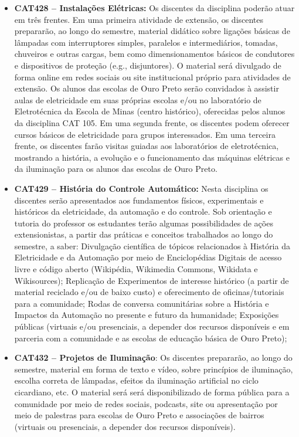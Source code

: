 \documentclass[
	12pt,				%
	openright,			%
	oneside,			%
	a4paper,			%
	english,			%
	brazil				%
	]{abntex2}
\begin{document}
\begin{itemize}
     \item \textbf{CAT428 -- Instalações Elétricas:} Os discentes da disciplina poderão atuar em três frentes. Em uma primeira atividade de extensão, os discentes prepararão, ao longo do semestre, material didático sobre ligações básicas de lâmpadas com interruptores simples, paralelos e intermediários, tomadas, chuveiros e outras cargas, bem como dimensionamentos básicos de condutores e dispositivos de proteção (e.g., disjuntores). O material será divulgado de forma online em redes sociais ou site institucional próprio para atividades de extensão. Os alunos das escolas de Ouro Preto serão convidados à assistir aulas de eletricidade em suas próprias escolas e/ou no laboratório de Eletrotécnica da Escola de Minas (centro histórico), oferecidas pelos alunos da disciplina CAT 105. Em uma segunda frente, os discentes podem oferecer cursos básicos de eletricidade para grupos interessados. Em uma terceira frente, os discentes farão visitas guiadas aos laboratórios de eletrotécnica, mostrando a história, a evolução e o funcionamento das máquinas elétricas e da iluminação para os alunos das escolas de Ouro Preto.

    \item \textbf{CAT429 -- História do Controle Automático:} Nesta disciplina os discentes serão apresentados aos fundamentos físicos, experimentais e históricos da eletricidade, da automação e do controle. Sob orientação e tutoria do professor os estudantes terão algumas possibilidades de ações extensionistas, a partir das práticas e conceitos trabalhados ao longo do semestre, a saber: Divulgação científica de tópicos relacionados à História da Eletricidade e da Automação por meio de Enciclopédias Digitais de acesso livre e código aberto (Wikipédia, Wikimedia Commons, Wikidata e Wikisources); Replicação de Experimentos de interesse histórico (a partir de material reciclado e/ou de baixo custo) e oferecimento de oficinas/tutoriais para a comunidade; Rodas de conversa comunitárias sobre a História e Impactos da Automação no presente e futuro da humanidade; Exposições públicas (virtuais e/ou presenciais, a depender dos recursos disponíveis e em parceria com a comunidade e as escolas de educação básica de Ouro Preto);

    \item \textbf{CAT432 -- Projetos de Iluminação}: Os discentes prepararão, ao longo do semestre, material em forma de texto e vídeo, sobre princípios de iluminação, escolha correta de lâmpadas, efeitos da iluminação artificial no ciclo cicardiano, etc. O material será será disponibilizado de forma pública para a comunidade por meio de redes sociais, podcasts, site ou apresentação por meio de palestras para escolas de Ouro Preto e associações de bairros (virtuais ou presenciais, a depender dos recursos disponíveis).


\end{itemize}
\end{document}
